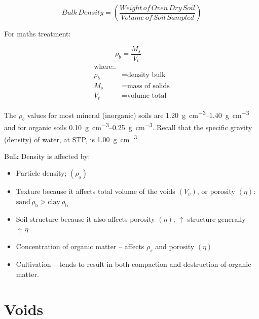 \documentclass[letterpaper, 12pt]{article}
\begin{document}
\begin{equation}
    Bulk\,Density = \left(\frac{Weight\,of\,Oven\,Dry\,Soil}{Volume\,of\,Soil\,Sampled}\right)
\end{equation}

\noindent\begin{minipage}{\textwidth}
For maths treatment:

\begin{equation}
    \rho_b = \frac{M_s}{V_t}\quad
\end{equation}
\begin{equation*}
    \begin{aligned}
    \text{where:}.                    \\
        \rho_b &= \text{density bulk} \\
        M_s &= \text{mass of solids}  \\
        V_t &= \text{volume total}
    \end{aligned}
\end{equation*}
\end{minipage}

The $\rho_b$ values for most mineral (inorganic) soils are \qtyrange[range-units=single]{1.20}{1.40}{\gram\per\cubic\cm} and for organic soils \qtyrange[range-units=single]{0.10}{0.25}{\gram\per\cubic\centi\meter}. Recall that the specific gravity (density) of water, at STP, is \qty[per-mode=fraction]{1.00}{\gram\per\cubic\centi\meter}.

Bulk Density is affected by:
\begin{itemize}
    \item Particle density; $\left(\rho_s\right)$  
    \item Texture because it affects total volume of the voids $\left(V_v\right)$, or porosity $\left(\eta\right)$:  $\text{sand}\,\rho_{\text{b}} > \text{clay}\,\rho_{\text{b}}$  
    \item Soil structure because it also affects porosity $\left(\eta\right)$; $\uparrow$  structure generally $\uparrow\,\eta$  
    \item Concentration of organic matter – affects $\rho_s$ and porosity $\left(\eta\right)$  
    \item Cultivation – tends to result in both compaction and destruction of organic matter.  
\end{itemize}

\section{Voids}
\label{voids}
\end{document}
